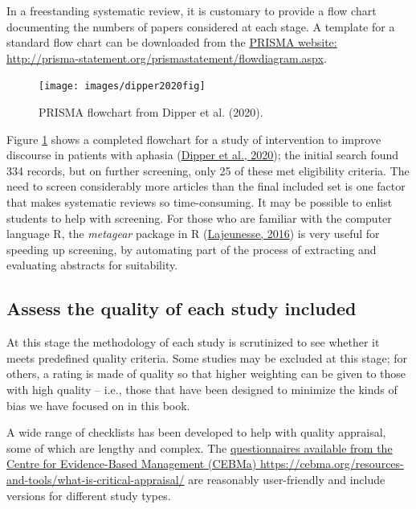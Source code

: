 \documentclass{krantz}
\begin{document}
In a freestanding systematic review, it is customary to provide a flow chart documenting the numbers of papers considered at each stage. A template for a standard flow chart can be downloaded from the \href{http://prisma-statement.org/prismastatement/flowdiagram.aspx}{PRISMA website: http://prisma-statement.org/prismastatement/flowdiagram.aspx}. 

\begin{figure}

{\centering \texttt{[image: images/dipper2020fig]} 

}

\caption{PRISMA flowchart from Dipper et al. (2020).}\label{fig:prismachart}
\end{figure}

Figure \ref{fig:prismachart} shows a completed flowchart for a study of intervention to improve discourse in patients with aphasia (\protect\hyperlink{ref-dipper2020}{Dipper et al., 2020}); the initial search found 334 records, but on further screening, only 25 of these met eligibility criteria. The need to screen considerably more articles than the final included set is one factor that makes systematic reviews so time-consuming. It may be possible to enlist students to help with screening. For those who are familiar with the computer language R, the \emph{metagear} package in R (\protect\hyperlink{ref-lajeunesse2016}{Lajeunesse, 2016}) is very useful for speeding up screening, by automating part of the process of extracting and evaluating abstracts for suitability.

\hypertarget{assess-the-quality-of-each-study-included}{%
\subsection{Assess the quality of each study included}\label{assess-the-quality-of-each-study-included}}

At this stage the methodology of each study is scrutinized to see whether it meets predefined quality criteria. Some studies may be excluded at this stage; for others, a rating is made of quality so that higher weighting can be given to those with high quality -- i.e., those that have been designed to minimize the kinds of bias we have focused on in this book.

A wide range of checklists has been developed to help with quality appraisal, some of which are lengthy and complex. The \href{https://cebma.org/resources-and-tools/what-is-critical-appraisal/}{questionnaires available from the Centre for Evidence-Based Management (CEBMa) https://cebma.org/resources-and-tools/what-is-critical-appraisal/} are reasonably user-friendly and include versions for different study types.
\end{document}
